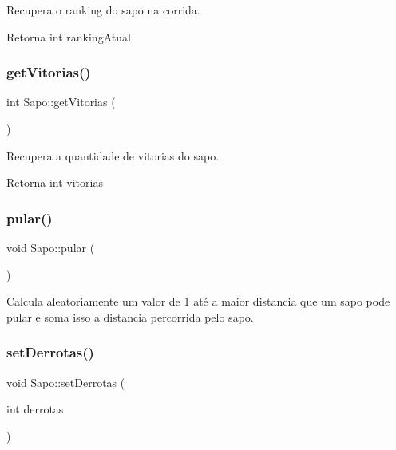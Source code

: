 Recupera o ranking do sapo na corrida. 

\begin{DoxyReturn}{Retorna}
int ranking\+Atual 
\end{DoxyReturn}
\mbox{\label{classSapo_a102f82c22691765c15873d4ea667156e}} 
\subsubsection{\texorpdfstring{get\+Vitorias()}{getVitorias()}}
{\footnotesize\ttfamily int Sapo\+::get\+Vitorias (\begin{DoxyParamCaption}{ }\end{DoxyParamCaption})}



Recupera a quantidade de vitorias do sapo. 

\begin{DoxyReturn}{Retorna}
int vitorias 
\end{DoxyReturn}
\mbox{\label{classSapo_a32e61c61677967120ae652099bd56805}} 
\subsubsection{\texorpdfstring{pular()}{pular()}}
{\footnotesize\ttfamily void Sapo\+::pular (\begin{DoxyParamCaption}{ }\end{DoxyParamCaption})}



Calcula aleatoriamente um valor de 1 até a maior distancia que um sapo pode pular e soma isso a distancia percorrida pelo sapo. 

\mbox{\label{classSapo_a955c0d19a8cfa0bb0acb6c56fabde4aa}} 
\subsubsection{\texorpdfstring{set\+Derrotas()}{setDerrotas()}}
{\footnotesize\ttfamily void Sapo\+::set\+Derrotas (\begin{DoxyParamCaption}\item[{int}]{derrotas }\end{DoxyParamCaption})}



